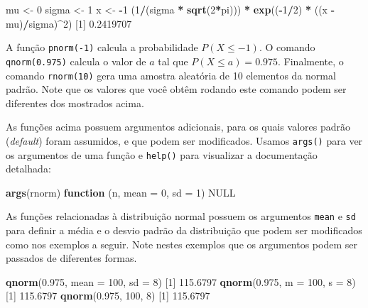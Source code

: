 \documentclass[10pt,a4paper]{book}
\newenvironment{Shaded}{\begin{snugshade}}{\end{snugshade}}
\newcommand{\KeywordTok}[1]{\textcolor[rgb]{0.13,0.29,0.53}{\textbf{#1}}}
\newcommand{\DataTypeTok}[1]{\textcolor[rgb]{0.13,0.29,0.53}{#1}}
\newcommand{\DecValTok}[1]{\textcolor[rgb]{0.00,0.00,0.81}{#1}}
\newcommand{\FloatTok}[1]{\textcolor[rgb]{0.00,0.00,0.81}{#1}}
\newcommand{\StringTok}[1]{\textcolor[rgb]{0.31,0.60,0.02}{#1}}
\newcommand{\OtherTok}[1]{\textcolor[rgb]{0.56,0.35,0.01}{#1}}
\newcommand{\ControlFlowTok}[1]{\textcolor[rgb]{0.13,0.29,0.53}{\textbf{#1}}}
\newcommand{\OperatorTok}[1]{\textcolor[rgb]{0.81,0.36,0.00}{\textbf{#1}}}
\newcommand{\NormalTok}[1]{#1}
\begin{document}
\begin{Shaded}
\begin{Highlighting}[]
\NormalTok{mu <-}\StringTok{ }\DecValTok{0}
\NormalTok{sigma <-}\StringTok{ }\DecValTok{1}
\NormalTok{x <-}\StringTok{ }\OperatorTok{-}\DecValTok{1}
\NormalTok{(}\DecValTok{1}\OperatorTok{/}\NormalTok{(sigma }\OperatorTok{*}\StringTok{ }\KeywordTok{sqrt}\NormalTok{(}\DecValTok{2}\OperatorTok{*}\NormalTok{pi))) }\OperatorTok{*}\StringTok{ }\KeywordTok{exp}\NormalTok{((}\OperatorTok{-}\DecValTok{1}\OperatorTok{/}\DecValTok{2}\NormalTok{) }\OperatorTok{*}\StringTok{ }\NormalTok{((x }\OperatorTok{-}\StringTok{ }\NormalTok{mu)}\OperatorTok{/}\NormalTok{sigma)}\OperatorTok{^}\DecValTok{2}\NormalTok{)}
\NormalTok{[}\DecValTok{1}\NormalTok{] }\FloatTok{0.2419707}
\end{Highlighting}
\end{Shaded}

A função \texttt{pnorm(-1)} calcula a probabilidade \(P(X \leq -1)\). O
comando \texttt{qnorm(0.975)} calcula o valor de \(a\) tal que
\(P(X \leq a) = 0.975\). Finalmente, o comando \texttt{rnorm(10)} gera
uma amostra aleatória de 10 elementos da normal padrão. Note que os
valores que você obtêm rodando este comando podem ser diferentes dos
mostrados acima.

As funções acima possuem argumentos adicionais, para os quais valores
padrão (\emph{default}) foram assumidos, e que podem ser modificados.
Usamos \texttt{args()} para ver os argumentos de uma função e
\texttt{help()} para visualizar a documentação detalhada:

\begin{Shaded}
\begin{Highlighting}[]
\KeywordTok{args}\NormalTok{(rnorm)}
\ControlFlowTok{function}\NormalTok{ (n, }\DataTypeTok{mean =} \DecValTok{0}\NormalTok{, }\DataTypeTok{sd =} \DecValTok{1}\NormalTok{) }
\OtherTok{NULL}
\end{Highlighting}
\end{Shaded}

As funções relacionadas à distribuição normal possuem os argumentos
\texttt{mean} e \texttt{sd} para definir a média e o desvio padrão da
distribuição que podem ser modificados como nos exemplos a seguir. Note
nestes exemplos que os argumentos podem ser passados de diferentes
formas.

\begin{Shaded}
\begin{Highlighting}[]
\KeywordTok{qnorm}\NormalTok{(}\FloatTok{0.975}\NormalTok{, }\DataTypeTok{mean =} \DecValTok{100}\NormalTok{, }\DataTypeTok{sd =} \DecValTok{8}\NormalTok{)}
\NormalTok{[}\DecValTok{1}\NormalTok{] }\FloatTok{115.6797}
\KeywordTok{qnorm}\NormalTok{(}\FloatTok{0.975}\NormalTok{, }\DataTypeTok{m =} \DecValTok{100}\NormalTok{, }\DataTypeTok{s =} \DecValTok{8}\NormalTok{)}
\NormalTok{[}\DecValTok{1}\NormalTok{] }\FloatTok{115.6797}
\KeywordTok{qnorm}\NormalTok{(}\FloatTok{0.975}\NormalTok{, }\DecValTok{100}\NormalTok{, }\DecValTok{8}\NormalTok{)}
\NormalTok{[}\DecValTok{1}\NormalTok{] }\FloatTok{115.6797}
\end{Highlighting}
\end{Shaded}
\end{document}
